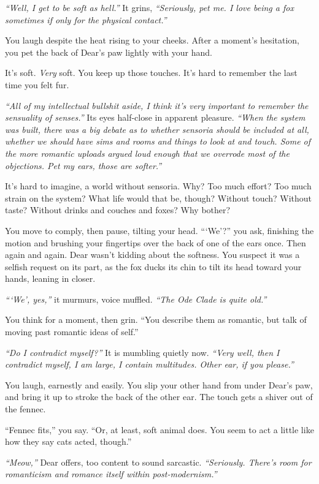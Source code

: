\emph{``Well, I get to be soft as hell.''} It grins, \emph{``Seriously, pet me. I love being a fox sometimes if only for the physical contact.''}

You laugh despite the heat rising to your cheeks. After a moment's hesitation, you pet the back of Dear's paw lightly with your hand.

It's soft. \emph{Very} soft. You keep up those touches. It's hard to remember the last time you felt fur.

\emph{``All of my intellectual bullshit aside, I think it's very important to remember the sensuality of senses.''} Its eyes half-close in apparent pleasure. \emph{``When the system was built, there was a big debate as to whether sensoria should be included at all, whether we should have sims and rooms and things to look at and touch. Some of the more romantic uploads argued loud enough that we overrode most of the objections. Pet my ears, those are softer.''}

It's hard to imagine, a world without sensoria. Why? Too much effort? Too much strain on the system? What life would that be, though? Without touch? Without taste? Without drinks and couches and foxes? Why bother?

You move to comply, then pause, tilting your head. ```We'?'' you ask, finishing the motion and brushing your fingertips over the back of one of the ears once. Then again and again. Dear wasn't kidding about the softness. You suspect it was a selfish request on its part, as the fox ducks its chin to tilt its head toward your hands, leaning in closer.

\emph{```We', yes,''} it murmurs, voice muffled. \emph{``The Ode Clade is quite old.''}

You think for a moment, then grin. ``You describe them as romantic, but talk of moving past romantic ideas of self.''

\emph{``Do I contradict myself?''} It is mumbling quietly now. \emph{``Very well, then I contradict myself, I am large, I contain multitudes. Other ear, if you please.''}

You laugh, earnestly and easily. You slip your other hand from under Dear's paw, and bring it up to stroke the back of the other ear. The touch gets a shiver out of the fennec.

``Fennec fits,'' you say. ``Or, at least, soft animal does. You seem to act a little like how they say cats acted, though.''

\emph{``Meow,''} Dear offers, too content to sound sarcastic. \emph{``Seriously. There's room for romanticism and romance itself within post-modernism.''}


